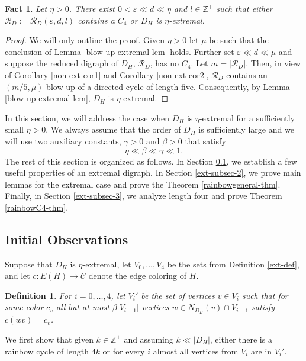 \documentclass{article}
\newtheorem{defn}[theorem]{Definition}
\newtheorem{fact}[theorem]{Fact}
\renewcommand{\epsilon}{{\varepsilon}}
\begin{document}
 \begin{fact}\label{fact-about-C4}
 Let $\eta>0$. There exist $0<\epsilon\ll d\ll \eta$ and $l\in \mathbb{Z}^+$ such that either $\mathcal{R}_D:=\mathcal{R}_D(\epsilon, d, l)$ contains a $C_4$ or $D_H$ is $\eta$-extremal. 
 \end{fact}
 \begin{proof}
     We will only outline the proof. Given $\eta>0$ let $\mu$ be such that the conclusion of Lemma \ref{blow-up-extremal-lem} holds. Further set $\epsilon \ll d\ll \mu$ and suppose the reduced digraph of $D_H$, $\mathcal{R}_D$, has no $C_4$. Let $m=|\mathcal{R}_D|$. Then, in view of Corollary \ref{non-ext-cor1} and Corollary \ref{non-ext-cor2}, $\mathcal{R}_D$ contains an $(m/5,\mu)$-blow-up of a directed cycle of length five. Consequently, by Lemma \ref{blow-up-extremal-lem}, $D_H$ is $\eta$-extremal. 
 \end{proof}
 In this section, we will address the case when $D_H$ is $\eta$-extremal for a sufficiently small $\eta>0$. We always assume that the order of $D_H$ is sufficiently large and we will use two auxiliary constants, $\gamma>0$ and $\beta>0$ that satisfy
 \begin{equation}\label{ext-eta-beta-gamma}
\eta \ll \beta \ll\gamma  \ll 1.
\end{equation}
The rest of this section is organized as follows. In Section \ref{ext-subsec-1}, we establish a few useful properties of an extremal digraph. In Section \ref{ext-subsec-2}, we prove main lemmas for the extremal case and prove the Theorem \ref{rainbowgeneral-thm}. Finally, in Section \ref{ext-subsec-3}, we analyze length four and prove Theorem  \ref{rainbowC4-thm}.
\subsection{Initial Observations}\label{ext-subsec-1}
Suppose that $D_H$ is $\eta$-extremal, let $V_0,\dots, V_4$ be the sets from Definition \ref{ext-def}, and let $c:E(H)\rightarrow \mathcal{C}$ denote the edge coloring of $H$.
\begin{defn}
For $i=0,\dots, 4$, let $V_i'$ be the set of vertices $v\in V_i$ such that for some color $c_v$  all but at most $\beta |V_{i-1}|$ vertices $w\in N^-_{D_H}(v)\cap V_{i-1}$ satisfy $c(wv)=c_v$.
\end{defn}
We first show that given $k\in \mathbb{Z}^+$ and assuming $k\ll |D_H|$, either there is a rainbow cycle of length $4k$ or for every $i$ almost all vertices from $V_i$ are in $V_i'$. 
\end{document}
